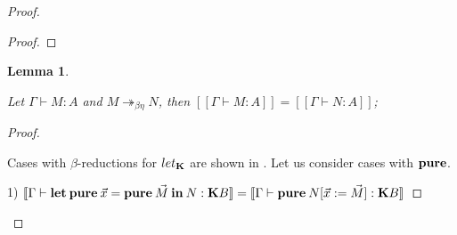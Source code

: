 \documentclass[a4paper]{article}
\newtheorem{lemma}{Lemma}
\begin{document}
\begin{proof}
\begin{proof}
\end{proof}

\begin{lemma}
  $ $

  Let $\Gamma \vdash M : A$ and $M \twoheadrightarrow_{\beta \eta} N$, then $[\![\Gamma \vdash M : A]\!] = [\![\Gamma \vdash N : A]\!]$;
\end{lemma}

\begin{proof}
  $ $

Cases with $\beta$-reductions for $let_{\bf K}$ are shown in \cite{ModalK1}. Let us consider cases with ${\bf pure}$.

\vspace{\baselineskip}

1) $[\![\Gamma \vdash {\bf let \: pure \:} \vec{x} = {\bf pure \:} \vec{M} {\: \bf in \:} N : {\bf K}B]\!] = [\![\Gamma \vdash {\bf pure \:} N [\vec{x} := \vec{M}] : {\bf K}B]\!]$

\vspace{\baselineskip}


\end{proof}
\end{proof}
\end{document}

